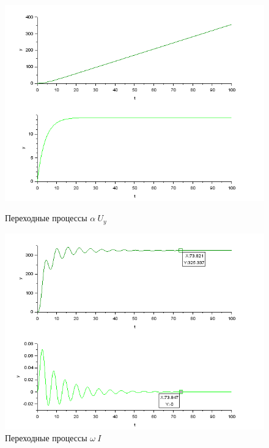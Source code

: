 \documentclass[a4paper,12pt,russian]{article} %
\begin{document}
\begin{figure}[H]
	\includegraphics[width=\linewidth]{521.png}
	\caption{Переходные процессы $\alpha\:  U_y$}\label{p521}
	\endminipage\hfill
	\includegraphics[width=\linewidth]{522.png}
	\caption{Переходные процессы $\omega\:  I$}\label{p522}
	\endminipage
\end{figure}
\end{document}
